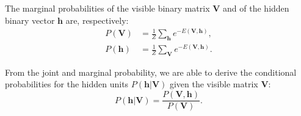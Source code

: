 The marginal probabilities of the visible binary matrix $\mathbf{V}$ and of the hidden binary vector $\mathbf{h}$ are, respectively:
\begin{align}
    \label{eq:app:rsm-marg-prob-visible}
    P(\mathbf{V}) &= \frac{1}{Z} \sum_{\mathbf{h}} e^{-E(\mathbf{V}, \mathbf{h})}, \\
    \label{eq:app:rsm-marg-prob-hidden}
    P(\mathbf{h}) &= \frac{1}{Z} \sum_{\mathbf{V}} e^{-E(\mathbf{V}, \mathbf{h})}.
\end{align}

From the joint and marginal probability, we are able to derive the conditional probabilities for the hidden units $P(\mathbf{h} | \mathbf{V})$ given the visible matrix $\mathbf{V}$:
\begin{equation}
    \label{eq:app:rsm-cond-prob-hidden}
    P(\mathbf{h} | \mathbf{V}) = \frac{P(\mathbf{V}, \mathbf{h})}{P(\mathbf{V})}.
\end{equation}

